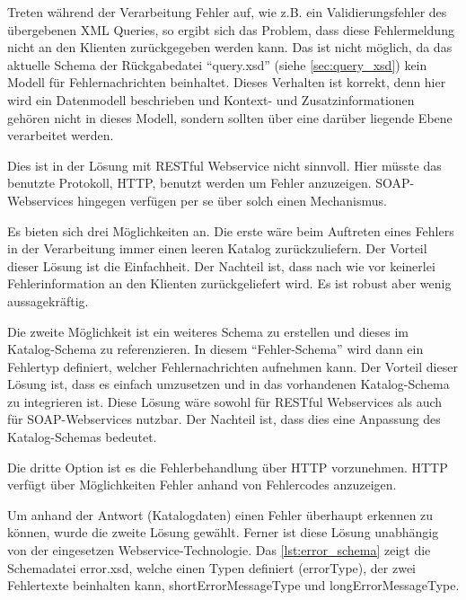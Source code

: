 Treten während der Verarbeitung Fehler auf, wie z.B. ein Validierungsfehler des übergebenen XML Queries, so ergibt sich das Problem, dass diese Fehlermeldung nicht an den Klienten zurückgegeben werden kann. Das ist nicht möglich, da das aktuelle Schema der Rückgabedatei \enquote{query.xsd}  (siehe \autoref{sec:query_xsd}) kein Modell für Fehlernachrichten beinhaltet. 
Dieses Verhalten ist korrekt, denn hier wird ein Datenmodell beschrieben und Kontext- und Zusatzinformationen gehören nicht in dieses Modell, sondern sollten über eine darüber liegende Ebene verarbeitet werden.

Dies ist in der Lösung mit \gls{REST}ful \gls{Webservice} nicht sinnvoll. Hier müsste das benutzte Protokoll, \gls{HTTP}, benutzt werden um Fehler anzuzeigen. \gls{SOAP}-\glspl{Webservice} hingegen verfügen per se über solch einen Mechanismus. 

Es bieten sich drei Möglichkeiten an. Die erste wäre beim Auftreten eines Fehlers in der Verarbeitung immer einen leeren Katalog zurückzuliefern. Der Vorteil dieser Lösung ist die Einfachheit. Der Nachteil ist, dass nach wie vor keinerlei Fehlerinformation an den Klienten zurückgeliefert wird. Es ist robust aber wenig aussagekräftig.

Die zweite Möglichkeit ist ein weiteres Schema zu erstellen und dieses im Katalog-Schema zu referenzieren. In diesem \enquote{Fehler-Schema} wird dann ein Fehlertyp definiert, welcher Fehlernachrichten aufnehmen kann. Der Vorteil dieser Lösung ist, dass es einfach umzusetzen und in das vorhandenen Katalog-Schema zu integrieren ist. Diese Lösung wäre sowohl für \gls{REST}ful \glspl{Webservice} als auch für \gls{SOAP}-\glspl{Webservice} nutzbar. Der Nachteil ist, dass dies eine Anpassung des Katalog-Schemas bedeutet. 

Die dritte Option ist es die Fehlerbehandlung über \gls{HTTP} vorzunehmen. \gls{HTTP} verfügt über Möglichkeiten Fehler anhand von Fehlercodes anzuzeigen. 

Um anhand der Antwort (Katalogdaten) einen Fehler überhaupt erkennen zu können, wurde die zweite Lösung gewählt. Ferner ist diese Lösung unabhängig von der eingesetzen \gls{Webservice}-Technologie. Das \autoref{lst:error_schema} zeigt die Schemadatei error.xsd, welche einen Typen definiert (errorType), der zwei Fehlertexte beinhalten kann, shortErrorMessageType und longErrorMessageType. 

